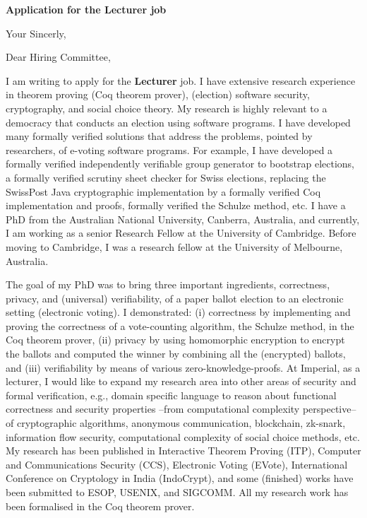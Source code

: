 \documentclass[11pt,a4paper,roman]{moderncv}
\begin{document}
\date{}
\opening{\textbf{Application for the Lecturer job}}
\closing{Your Sincerly, \vspace{-1em}}



\makelettertitle

Dear Hiring Committee, 

I am writing to apply
for the \textbf{Lecturer} job. 
I have extensive research experience in
theorem proving (Coq theorem prover), (election) software security, cryptography,  
and social choice theory. My research is highly relevant to a democracy that conducts 
an election using software programs. I have developed many formally verified 
solutions that address the problems, pointed by researchers, 
of e-voting software programs. 
For example, I have developed a formally verified independently 
verifiable group generator to bootstrap elections, a formally verified 
scrutiny sheet checker for Swiss elections, replacing the SwissPost Java 
cryptographic implementation by a formally verified Coq implementation and proofs,  
formally verified the Schulze method, etc.
I have a PhD from the Australian National University, Canberra, Australia,
and currently, I am working as a senior Research Fellow at the University of 
Cambridge. Before moving to Cambridge, I was a 
research fellow at the University of Melbourne, Australia.



The goal of my PhD was to 
bring  three important ingredients, correctness, privacy, and (universal) verifiability, of a 
paper ballot election to an electronic setting (electronic voting). I 
demonstrated: (i) correctness by implementing and proving the correctness of 
a vote-counting algorithm, the Schulze method, in the Coq theorem prover, 
(ii) privacy by using homomorphic encryption to encrypt the ballots and computed
the winner by combining all the (encrypted) ballots, and 
(iii) verifiability by means of various zero-knowledge-proofs.
At Imperial, as a lecturer, 
I would like to expand my research area into other areas of 
security and formal verification, e.g., domain specific language to reason about 
functional correctness and security properties --from computational complexity perspective-- of 
cryptographic algorithms, anonymous communication, blockchain, zk-snark,  
information flow security, computational complexity of social choice methods, 
etc. My research has been published in Interactive Theorem Proving (ITP), 
Computer and Communications Security (CCS), Electronic Voting (EVote), 
International Conference on Cryptology in India (IndoCrypt),
and some (finished) works have been submitted to ESOP, USENIX, and SIGCOMM. 
All my research work has been formalised in the Coq theorem prover. 
\end{document}
